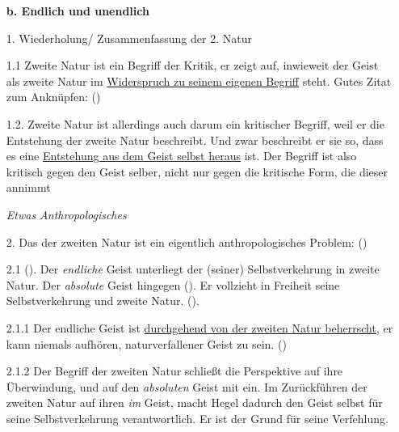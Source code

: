 \documentclass[12pt, a4paper, openany]{report}
\begin{document}
\begin{itemize}
    \item[] \textbf{b. Endlich und unendlich} 
    \item[1.] Wiederholung/ Zusammenfassung der 2. Natur
    \item[1.1] Zweite Natur ist ein Begriff der Kritik, er zeigt auf, inwieweit der Geist als zweite Natur im \ul{Widerspruch zu seinem eigenen Begriff} steht. 
    Gutes Zitat zum Anknüpfen:  (\cite[][43]{menke_autonomie_2018})
    \item[1.2.] Zweite Natur ist allerdings auch darum ein kritischer Begriff, weil er die Entstehung der zweite Natur beschreibt.
    Und zwar beschreibt er sie so, dass es eine \ul{Entstehung aus dem Geist selbst heraus} ist. 
    Der Begriff ist also kritisch gegen den Geist selber, nicht nur gegen die kritische Form, die dieser annimmt
    \item[] \textit{Etwas Anthropologisches}
    \item[2.] Das  der zweiten Natur ist ein eigentlich anthropologisches Problem: 
     (\cite[][138]{menke_autonomie_2018})
    \item[2.1]  (\cite[][140]{menke_autonomie_2018}).
    Der \emph{endliche} Geist unterliegt der (seiner) Selbstverkehrung in zweite Natur.
    Der \emph{absolute} Geist hingegen  (\cite[][140]{menke_autonomie_2018}). 
    Er vollzieht in Freiheit seine Selbstverkehrung und zweite Natur.
     (\cite[][140]{menke_autonomie_2018}).
    \item[2.1.1] Der endliche Geist ist \ul{durchgehend von der zweiten Natur beherrscht}, er kann niemals aufhören, naturverfallener Geist zu sein. (\cite[Vgl.][139]{menke_autonomie_2018})
    \item[2.1.2] Der Begriff der zweiten Natur schließt die Perspektive auf ihre Überwindung, und auf den \emph{absoluten} Geist mit ein.
    Im Zurückführen der zweiten Natur auf ihren  \emph{im} Geist, macht Hegel dadurch den Geist selbst für seine Selbstverkehrung verantwortlich.
    Er ist der Grund für seine Verfehlung.

\end{itemize}
\end{document}
